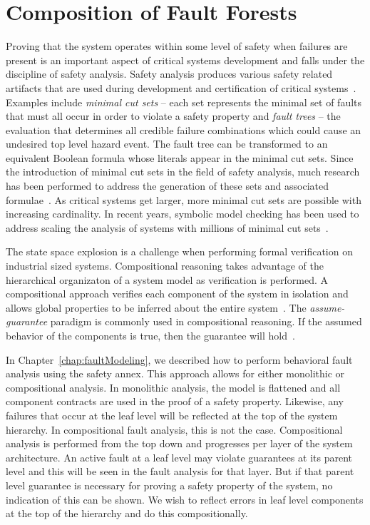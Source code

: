 \chapter{Composition of Fault Forests}
\label{chap:compFF}
Proving that the system operates within some level of safety when failures are present is an important aspect of critical systems development and falls under the discipline of safety analysis. Safety analysis produces various safety related artifacts that are used during development and certification of critical systems~\cite{SAE:ARP4754A}. Examples include {\em minimal cut sets} -- each set represents the minimal set of faults that must all occur in order to violate a safety property and {\em fault trees} -- the evaluation that determines all credible failure combinations which could cause an undesired top level hazard event. The fault tree can be transformed to an equivalent Boolean formula whose literals appear in the minimal cut sets. Since the introduction of minimal cut sets in the field of safety analysis, much research has been performed to address the generation of these sets and associated formulae~\cite{vesely1981fault,fta:survey,historyFTA}. As critical systems get larger, more minimal cut sets are possible with increasing cardinality. In recent years, symbolic model checking has been used to address scaling the analysis of systems with millions of minimal cut sets~\cite{bieber2002combination,schafer2003combining,symbFTA}. 

The state space explosion is a challenge when performing formal verification on industrial sized systems. Compositional reasoning takes advantage of the hierarchical organizaton of a system model as verification is performed. A compositional approach verifies each component of the system in isolation and allows global properties to be inferred about the entire system~\cite{berezin1997compositional}. The {\em assume-guarantee} paradigm is commonly used in compositional reasoning. If the assumed behavior of the components is true, then the guarantee will hold~\cite{NFM2012:CoGaMiWhLaLu}.

In Chapter~\ref{chap:faultModeling}, we described how to perform behavioral fault analysis using the safety annex. This approach allows for either monolithic or compositional analysis. In monolithic analysis, the model is flattened and all component contracts are used in the proof of a safety property. Likewise, any failures that occur at the leaf level will be reflected at the top of the system hierarchy. In compositional fault analysis, this is not the case. Compositional analysis is performed from the top down and progresses per layer of the system architecture. An active fault at a leaf level may violate guarantees at its parent level and this will be seen in the fault analysis for that layer. But if that parent level guarantee is necessary for proving a safety property of the system, no indication of this can be shown. We wish to reflect errors in leaf level components at the top of the hierarchy and do this compositionally. 

